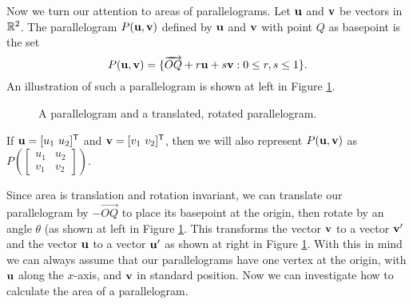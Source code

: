 Now we turn our attention to areas of parallelograms. Let $\mathbf{u}$ and $\mathbf{v}$ be vectors in $\mathbb{R}^2$. The parallelogram $P(\mathbf{u},\mathbf{v})$ defined by $\mathbf{u}$ and $\mathbf{v}$ with point $Q$ as basepoint is the set
\[P(\mathbf{u}, \mathbf{v}) = \{\overrightarrow{OQ}+r \mathbf{u} + s \mathbf{v} : 0 \leq r, s \leq 1\}.\]
An illustration of such a parallelogram is shown at left in Figure \ref{F:parallelograms}.
\begin{figure}[ht]
  \begin{center}
    \caption{A parallelogram and a translated, rotated parallelogram.}
    \label{F:parallelograms}
  \end{center}
\end{figure}
If $\mathbf{u} = [u_1 \ u_2]^{\mathsf{T}}$ and $\mathbf{v} = [v_1 \ v_2]^{\mathsf{T}}$, then we will also represent $P(\mathbf{u},\mathbf{v})$ as $P\left( \left[ \begin{array}{cc}u_1&u_2 \\ v_1&v_2 \end{array} \right] \right)$. 

Since area is translation and rotation invariant, we can translate our parallelogram by $-\overrightarrow{OQ}$ to place its basepoint at the origin, then rotate by an angle $\theta$ (as shown at left in Figure \ref{F:parallelograms}. This transforms the vector $\mathbf{v}$ to a vector $\mathbf{v}'$ and the vector $\mathbf{u}$ to a vector $\mathbf{u}'$ as shown at right in Figure \ref{F:parallelograms}. With this in mind we can always assume that our parallelograms have one vertex at the origin, with $\mathbf{u}$ along the $x$-axis, and $\mathbf{v}$ in standard position. Now we can investigate how to calculate the area of a parallelogram. 

